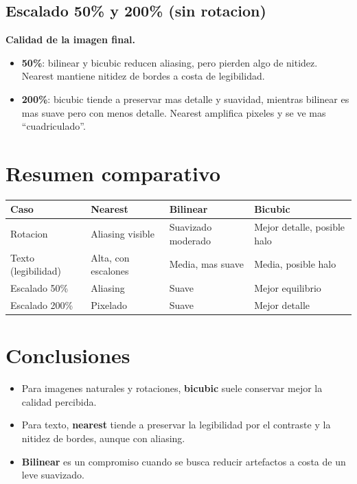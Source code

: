 \documentclass[11pt]{article}
\begin{document}
\subsection*{Escalado 50\% y 200\% (sin rotacion)}
\textbf{Calidad de la imagen final.}

\begin{itemize}
  \item \textbf{50\%}: bilinear y bicubic reducen aliasing, pero pierden algo de
        nitidez. Nearest mantiene nitidez de bordes a costa de legibilidad.
  \item \textbf{200\%}: bicubic tiende a preservar mas detalle y suavidad, mientras
        bilinear es mas suave pero con menos detalle. Nearest amplifica pixeles y
        se ve mas ``cuadriculado''.
\end{itemize}

\section*{Resumen comparativo}
\begin{center}
\begin{tabular}{@{}llll@{}}
\toprule
Caso & Nearest & Bilinear & Bicubic \\ \midrule
Rotacion & Aliasing visible & Suavizado moderado & Mejor detalle, posible halo \\
Texto (legibilidad) & Alta, con escalones & Media, mas suave & Media, posible halo \\
Escalado 50\% & Aliasing & Suave & Mejor equilibrio \\
Escalado 200\% & Pixelado & Suave & Mejor detalle \\ \bottomrule
\end{tabular}
\end{center}

\section*{Conclusiones}
\begin{itemize}
  \item Para imagenes naturales y rotaciones, \textbf{bicubic} suele conservar
        mejor la calidad percibida.
  \item Para texto, \textbf{nearest} tiende a preservar la legibilidad por el
        contraste y la nitidez de bordes, aunque con aliasing.
  \item \textbf{Bilinear} es un compromiso cuando se busca reducir artefactos a
        costa de un leve suavizado.
\end{itemize}
\end{document}
